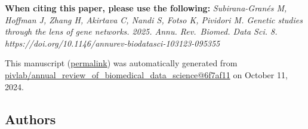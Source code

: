{ \textbf{When citing this paper, please use the following:}
\emph{Subirana-Granés M, Hoffman J, Zhang H, Akirtava C, Nandi S, Fotso K, Pividori M. Genetic studies through the lens of gene networks. 2025. Annu. Rev.~Biomed. Data Sci. 8. https://doi.org/10.1146/annurev-biodatasci-103123-095355}}

This manuscript
(\href{https://pivlab.github.io/annual_review_of_biomedical_data_science/v/6f7af112710ae5f8179f2e9d88b13533a8cab962/}{permalink})
was automatically generated
from \href{https://github.com/pivlab/annual_review_of_biomedical_data_science/tree/6f7af112710ae5f8179f2e9d88b13533a8cab962}{pivlab/annual\_review\_of\_biomedical\_data\_science@6f7af11}
on October 11, 2024.

\hypertarget{authors}{%
\subsection{Authors}\label{authors}}

